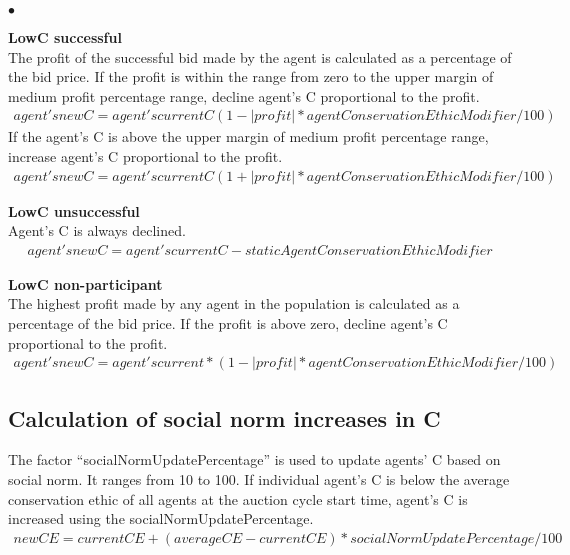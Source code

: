 \documentclass{article} %
\newenvironment{tightitemize}{
                \begin{list}{$\bullet$}{
                    \setlength{\itemsep}{-1pt}}{\setlength{\topsep}{0pt}}}{
                \end{list}}
\begin{document}
\begin{tightitemize}
\item {\bf LowC successful }\\ %
The profit of the successful bid made by the agent is calculated as a 
percentage of the bid price. If the profit is within the range from zero 
to the upper margin of medium profit percentage range, decline agent's 
C proportional to the profit. 
\begin{equation}\label{xx}
\begin{split}
agent's new C = agent's current C ( 1- |profit| * agentConservationEthicModifier/100)
\end{split}
\end{equation}
If the agent's C is above the upper margin of medium profit percentage 
range, increase agent's C proportional to the profit.
\begin{equation}\label{xx}
\begin{split}
agent's new C = agent's current C ( 1+ |profit| * agentConservationEthicModifier/100)
\end{split}
\end{equation}

\item {\bf LowC unsuccessful}\\ %
Agent's C is always declined.
\begin{equation}\label{xx}
\begin{split}
agent's new C = agent's current C - staticAgentConservationEthicModifier
\end{split}
\end{equation}

\item {\bf LowC non-participant}\\ %
The highest profit made by any agent in the population is calculated as 
a percentage of the bid price. If the profit is above zero, decline agent's 
C proportional to the profit.
\begin{equation}\label{xx}
\begin{split}
agent's new C = agent's current  * (1 - |profit| * agentConservationEthicModifier/100)
\end{split}
\end{equation}

\end{tightitemize}

\subsection{Calculation of social norm increases in C}
The factor \enquote{socialNormUpdatePercentage} is used to update agents' 
C based on social norm. It ranges from 10 to 100.
If individual agent's C is below the average conservation ethic of all 
agents at the auction cycle start time, agent's C is increased using 
the socialNormUpdatePercentage. 
\begin{equation}
\begin{split}
new CE = current CE + (average CE - current CE) * socialNormUpdatePercentage/100
\end{split}
\end{equation}
\end{document}
